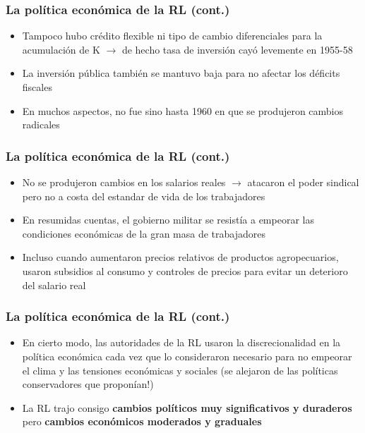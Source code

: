 \documentclass[14pt,aspectratio=169]{beamer}
\begin{document}
  \begin{frame}\frametitle{La política económica de la
                    RL (cont.)}
                 \begin{itemize}\itemsep 5pt \medskip
                 \item Tampoco hubo crédito flexible ni tipo de cambio
                   diferenciales para la acumulación de K
                   $\longrightarrow$ de hecho tasa de inversión cayó
                   levemente en 1955-58
                   \item La inversión pública también se mantuvo baja
                     para no afectar los déficits fiscales
                     \item En muchos aspectos, no fue sino hasta 1960
                       en que se produjeron cambios radicales
                   \end{itemize}
               \end{frame}
               


  \begin{frame}\frametitle{La política económica de la
                    RL (cont.)}
                 \begin{itemize}\itemsep 5pt \medskip
                 \item No se produjeron cambios en los salarios reales
                   $\longrightarrow$ atacaron el poder sindical pero
                   no a costa del estandar de vida de los trabajadores
                   \item En resumidas cuentas, el gobierno militar
                    se resistía a empeorar las condiciones económicas
                    de la gran masa de trabajadores
                    \item Incluso cuando aumentaron precios relativos
                      de productos agropecuarios, usaron subsidios al
                      consumo y controles de precios para evitar un
                      deterioro del salario real
                   \end{itemize}
               \end{frame}


  \begin{frame}\frametitle{La política económica de la
                    RL (cont.)}
                 \begin{itemize}\itemsep 5pt \medskip
                 \item En cierto modo, las autoridades de la RL usaron
                   la discrecionalidad en la política económica cada
                   vez que lo consideraron necesario para no empeorar
                   el clima y las tensiones económicas y sociales (se
                   alejaron de las políticas conservadores que proponían!)
                   \item La RL trajo consigo \textbf{cambios políticos
                       muy significativos y duraderos} pero
                     \textbf{cambios económicos moderados y graduales}
                   \end{itemize}
               \end{frame}
\end{document}
